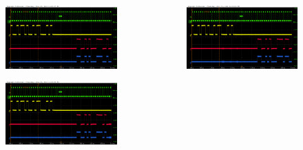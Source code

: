 \documentclass[aspectratio=169]{beamer}
\begin{document}
\begin{frame}
\begin{columns}
\begin{center}
\begin{figure}
				\includegraphics[width=0.95 \textwidth]{IMG/probe/09-08-2021_ch05-read57-baselinedac1.png}
				\caption{}
			\end{figure}
			\begin{figure}
				\includegraphics[width=0.95 \textwidth]{IMG/probe/09-08-2021_ch05-read58-baselinedac1.png}
				\caption{}
			\end{figure}	
		\end{center}
		\begin{center}
			\begin{figure}
				\includegraphics[width=0.95 \textwidth]{IMG/probe/09-08-2021_ch05-read59-baselinedac1.png}

\end{figure}
\end{center}
\end{columns}
\end{frame}
\end{document}
